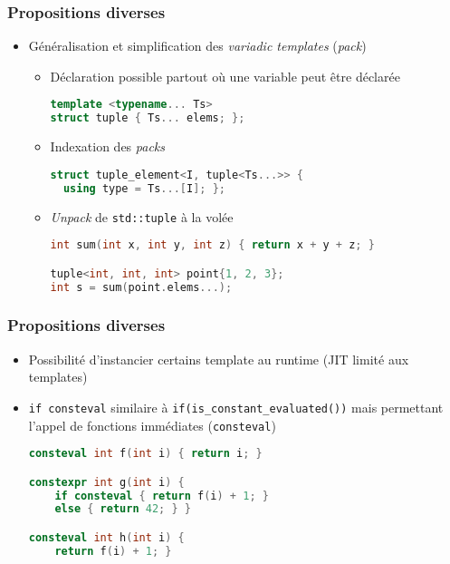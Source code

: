 \documentclass[C++.tex]{subfiles}
\begin{document}
\begin{frame}[fragile]
	\frametitle{Propositions diverses}
	\begin{itemize}
		\item Généralisation et simplification des \textit{variadic templates} (\textit{pack})
		\begin{itemize}
			\item Déclaration possible partout où une variable peut être déclarée

			\begin{lstlisting}[language=C++]
template <typename... Ts>
struct tuple { Ts... elems; };\end{lstlisting}

			\item Indexation des \textit{packs}

			\begin{lstlisting}[language=C++]
struct tuple_element<I, tuple<Ts...>> {
  using type = Ts...[I]; };\end{lstlisting}

			\item \og \textit{Unpack}\fg{} de \lstinline|std::tuple| à la volée

			\begin{lstlisting}[language=C++]
int sum(int x, int y, int z) { return x + y + z; }

tuple<int, int, int> point{1, 2, 3};
int s = sum(point.elems...);\end{lstlisting}

		\end{itemize}
	\end{itemize}
\end{frame}

\begin{frame}[fragile]
  \frametitle{Propositions diverses}
  \begin{itemize}
	\item Possibilité d'instancier certains template au runtime (JIT limité aux templates)


	\item \lstinline|if consteval| similaire à \lstinline|if(is_constant_evaluated())| mais permettant l'appel de fonctions immédiates (\lstinline|consteval|)

	\begin{lstlisting}[language=C++]
consteval int f(int i) { return i; }

constexpr int g(int i) {
	if consteval { return f(i) + 1;	} 
	else { return 42; } }

consteval int h(int i) {
	return f(i) + 1; } \end{lstlisting}

	\end{itemize}
\end{frame}
\end{document}
